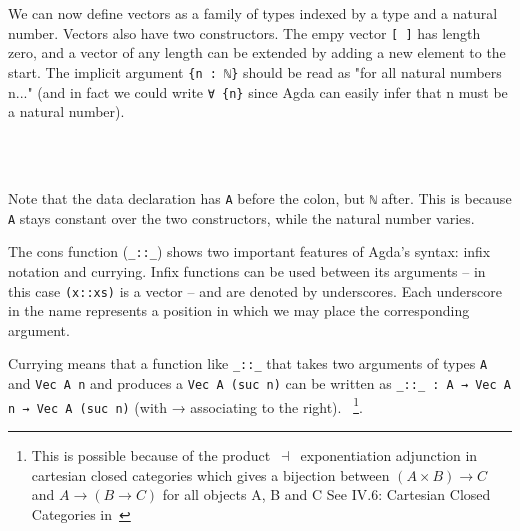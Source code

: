 We can now define vectors as a family of types indexed by a type and a natural number.
Vectors also have two constructors. The empy vector \texttt{[~]} has length zero, and a vector of any length can be extended by adding a new element to the start.
The implicit argument \texttt{\{n~:~ℕ\}} should be read as "for all natural numbers n..." (and in fact we could write \texttt{∀~\{n\}} since Agda can easily infer that n must be a natural number).
\begin{code}%
\>[0]\AgdaSpace{}%
\AgdaSpace{}%
\AgdaSymbol{(}\AgdaSpace{}%
\AgdaSymbol{:}\AgdaSpace{}%
\AgdaSymbol{)}\AgdaSpace{}%
\AgdaSymbol{:}\AgdaSpace{}%
\AgdaSpace{}%
\AgdaSpace{}%
\AgdaSpace{}%
\<%
\\
\>[0][@{}l@{\AgdaIndent{0}}]%
\>[2]\AgdaInductiveConstructor{[]}\AgdaSpace{}%
\AgdaSymbol{:}\AgdaSpace{}%
\AgdaSpace{}%
\AgdaSpace{}%
\<%
\\
%
\>[2]\AgdaOperator{\AgdaInductiveConstructor{\AgdaUnderscore{}::\AgdaUnderscore{}}}\AgdaSpace{}%
\AgdaSymbol{:}\AgdaSpace{}%
\AgdaSymbol{\{}\AgdaSpace{}%
\AgdaSymbol{:}\AgdaSpace{}%
\AgdaSymbol{\}}\AgdaSpace{}%
\AgdaSpace{}%
\AgdaSpace{}%
\AgdaSpace{}%
\AgdaSpace{}%
\AgdaSpace{}%
\AgdaSpace{}%
\AgdaSpace{}%
\AgdaSpace{}%
\AgdaSpace{}%
\AgdaSymbol{(}\AgdaSpace{}%
\AgdaSymbol{)}\<%
\end{code}

Note that the data declaration has \texttt{A} before the colon, but \texttt{ℕ} after.
This is because \texttt{A} stays constant over the two constructors, while the natural number varies.

The cons function (\texttt{\_::\_}) shows two important features of Agda's syntax: infix notation and currying.
Infix functions can be used between its arguments -- in this case \texttt{(x::xs)} is a vector --
and are denoted by underscores.
Each underscore in the name represents a position in which we may place the corresponding argument.

Currying means that a function like \texttt{\_::\_} that takes two arguments of types
\texttt{A} and \texttt{Vec A n} and produces a \texttt{Vec A (suc n)} can be written as
\texttt{\_::\_ : A → Vec A n → Vec A (suc n)} (with → associating to the right).
~\footnote{This is possible because of the product~$\dashv$~exponentiation
adjunction in cartesian closed categories which gives a bijection
between $(A \times B) \rightarrow C$ and $A \rightarrow (B \rightarrow C)$ for all objects A, B and C
See IV.6: Cartesian Closed Categories in~\cite{maclane1998}}.

